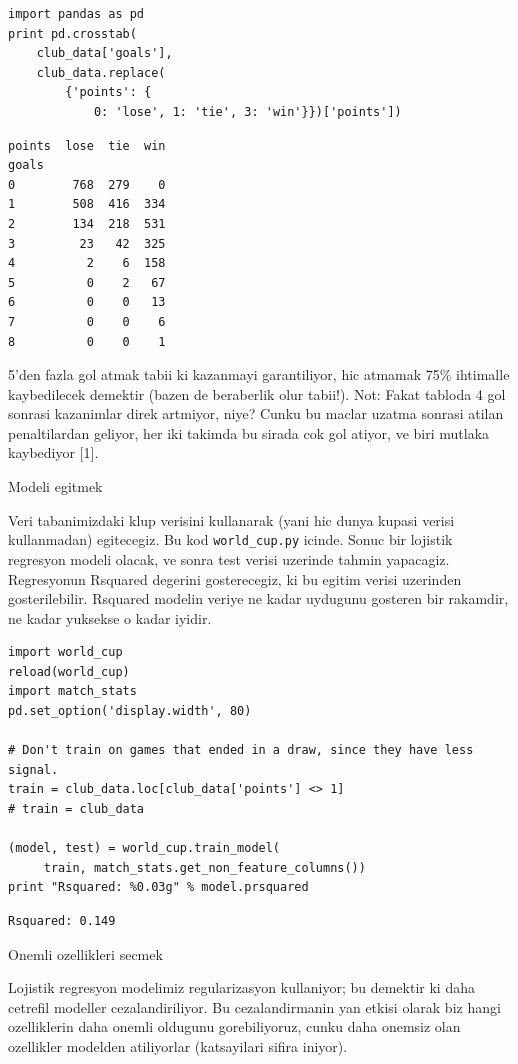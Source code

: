 \documentclass[12pt,fleqn]{article}\usepackage{../common}
\begin{document}
\begin{verbatim}
import pandas as pd
print pd.crosstab(
    club_data['goals'], 
    club_data.replace(
        {'points': {
            0: 'lose', 1: 'tie', 3: 'win'}})['points'])
\end{verbatim}

\begin{verbatim}
points  lose  tie  win
goals                 
0        768  279    0
1        508  416  334
2        134  218  531
3         23   42  325
4          2    6  158
5          0    2   67
6          0    0   13
7          0    0    6
8          0    0    1
\end{verbatim}

5'den fazla gol atmak tabii ki kazanmayi garantiliyor, hic atmamak 75\%
ihtimalle kaybedilecek demektir (bazen de beraberlik olur tabii!). Not:
Fakat tabloda 4 gol sonrasi kazanimlar direk artmiyor, niye? Cunku bu
maclar uzatma sonrasi atilan penaltilardan geliyor, her iki takimda bu
sirada cok gol atiyor, ve biri mutlaka kaybediyor [1].

Modeli egitmek

Veri tabanimizdaki klup verisini kullanarak (yani hic dunya kupasi verisi
kullanmadan) egitecegiz. Bu kod  \verb!world_cup.py! icinde. Sonuc bir
lojistik regresyon modeli olacak, ve sonra test verisi uzerinde tahmin
yapacagiz. Regresyonun Rsquared degerini gosterecegiz, ki bu egitim
verisi uzerinden gosterilebilir. Rsquared modelin veriye ne kadar uydugunu
gosteren bir rakamdir, ne kadar yuksekse o kadar iyidir.

\begin{verbatim}
import world_cup
reload(world_cup)
import match_stats
pd.set_option('display.width', 80)

# Don't train on games that ended in a draw, since they have less signal.
train = club_data.loc[club_data['points'] <> 1] 
# train = club_data

(model, test) = world_cup.train_model(
     train, match_stats.get_non_feature_columns())
print "Rsquared: %0.03g" % model.prsquared
\end{verbatim}

\begin{verbatim}
Rsquared: 0.149
\end{verbatim}

Onemli ozellikleri secmek

Lojistik regresyon modelimiz regularizasyon kullaniyor; bu demektir ki daha
cetrefil modeller cezalandiriliyor. Bu cezalandirmanin yan etkisi olarak
biz hangi ozelliklerin daha onemli oldugunu gorebiliyoruz, cunku daha
onemsiz olan ozellikler modelden atiliyorlar (katsayilari sifira iniyor). 
\end{document}
